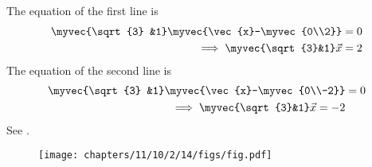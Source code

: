 The equation of the first line is 
\begin{align}
	\myvec{\sqrt{3} &1}\myvec{\vec{x}-\myvec{0\\2}}&=0
	\\
	\implies 
	\myvec{\sqrt{3}&1}
	\vec{x}&=2
\end{align}
The equation of the second line is 
\begin{align}
	\myvec{\sqrt{3} &1}\myvec{\vec{x}-\myvec{0\\-2}}&=0
	\\
	\implies 
	\myvec{\sqrt{3}&1}
\vec{x}=-2
\end{align}
See
		.
	\begin{figure}[H]
		\centering
 \texttt{[image: chapters/11/10/2/14/figs/fig.pdf]}
		\caption{}
		\label{fig:11/10/2/14}
  	\end{figure}
